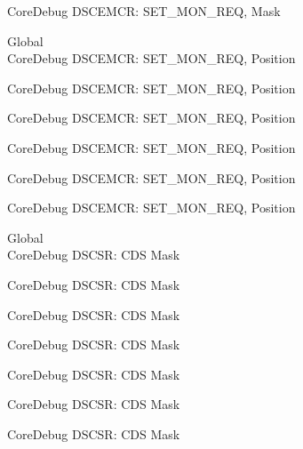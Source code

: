 \begin{DoxyRefList}
\label{deprecated__deprecated001307}%
%
Core\+Debug DSCEMCR\+: SET\+\_\+\+MON\+\_\+\+REQ, Mask  
\item[Global \doxylink{group___c_m_s_i_s___s_c_b_ga77f02a6d773fa2c6daafbbdd7df2d9d2}{Core\+Debug\+\_\+\+DSCEMCR\+\_\+\+SET\+\_\+\+MON\+\_\+\+REQ\+\_\+\+Pos} ]\hfill \\
\label{deprecated__deprecated000075}%
%
Core\+Debug DSCEMCR\+: SET\+\_\+\+MON\+\_\+\+REQ, Position 

\label{deprecated__deprecated000526}%
%
Core\+Debug DSCEMCR\+: SET\+\_\+\+MON\+\_\+\+REQ, Position 

\label{deprecated__deprecated000628}%
%
Core\+Debug DSCEMCR\+: SET\+\_\+\+MON\+\_\+\+REQ, Position 

\label{deprecated__deprecated000753}%
%
Core\+Debug DSCEMCR\+: SET\+\_\+\+MON\+\_\+\+REQ, Position 

\label{deprecated__deprecated001204}%
%
Core\+Debug DSCEMCR\+: SET\+\_\+\+MON\+\_\+\+REQ, Position 

\label{deprecated__deprecated001306}%
%
Core\+Debug DSCEMCR\+: SET\+\_\+\+MON\+\_\+\+REQ, Position  
\item[Global \doxylink{group___c_m_s_i_s___s_c_b_ga083417245e1aa40e84a2b12433a15a6b}{Core\+Debug\+\_\+\+DSCSR\+\_\+\+CDS\+\_\+\+Msk} ]\hfill \\
\label{deprecated__deprecated000094}%
%
Core\+Debug DSCSR\+: CDS Mask 

\label{deprecated__deprecated000148}%
%
Core\+Debug DSCSR\+: CDS Mask 

\label{deprecated__deprecated000224}%
%
Core\+Debug DSCSR\+: CDS Mask 

\label{deprecated__deprecated000287}%
%
Core\+Debug DSCSR\+: CDS Mask 

\label{deprecated__deprecated000366}%
%
Core\+Debug DSCSR\+: CDS Mask 

\label{deprecated__deprecated000442}%
%
Core\+Debug DSCSR\+: CDS Mask 

\label{deprecated__deprecated000545}%
%
Core\+Debug DSCSR\+: CDS Mask 


\end{DoxyRefList}
